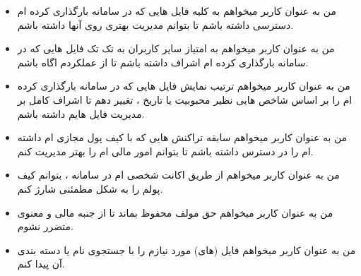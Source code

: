\documentclass{article}
\begin{document}
\begin{itemize}
	\item من به عنوان کاربر میخواهم به کلیه فایل هایی که در سامانه بارگذاری کرده ام دسترسی داشته باشم تا بتوانم مدیریت بهتری روی آنها داشته باشم.
	
	\item من به عنوان کاربر میخواهم به امتیاز سایر کاربران به تک تک فایل هایی که در سامانه بارگذاری کرده ام اشراف  داشته باشم تا از عملکردم اگاه باشم.
	
	\item من به عنوان کاربر میخواهم ترتیب نمایش فایل هایی که در سامانه بارگذاری کرده ام را بر اساس شاخص هایی نظیر محبوبیت یا تاریخ ، تغییر دهم تا اشراف کامل بر مدیریت فایل هایم داشته باشم.
	
	\item من به عنوان کاربر میخواهم سابقه تراکنش هایی که با کیف پول مجازی ام داشته ام را در دسترس داشته باشم تا بتوانم امور مالی ام را بهتر مدیریت کنم.
	
	\item من به عنوان کاربر میخواهم از طریق اکانت شخصی ام در سامانه ، بتوانم کیف پولم را به شکل مطمئنی شارژ کنم.
	
	\item من به عنوان کاربر میخواهم حق مولف محفوظ بماند تا از جنبه مالی و معنوی متضرر نشوم.
	
	\item من به عنوان کاربر میخواهم فایل (های) مورد نیازم را با جستجوی نام یا دسته بندی آن پیدا کنم.
		
\end{itemize}
\end{document}
